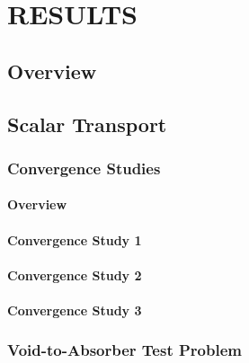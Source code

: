 \chapter{RESULTS}

\section{Overview}
  
\section{Scalar Transport\label{sec:transport_results}}
\subsection{Convergence Studies\label{sec:convergence}}
  \subsubsection{Overview\label{sec:convergence_overview}}
    
  \subsubsection{Convergence Study 1\label{sec:mms_sinx}}
    
  \subsubsection{Convergence Study 2\label{sec:mms_x_expt}}
    
  \subsubsection{Convergence Study 3\label{sec:mms_sinx_expt}}
    
\subsection{Void-to-Absorber Test Problem\label{sec:void_to_absorber}}
  
